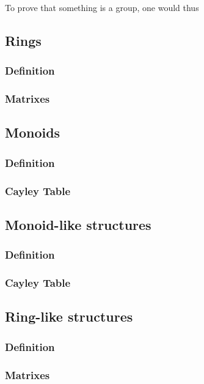 To prove that something is a group, one would thus
\subsection{Rings}
\subsubsection{Definition}
\subsubsection{Matrixes}
\subsection{Monoids}
\subsubsection{Definition}
\subsubsection{Cayley Table}
\subsection{Monoid-like structures}
\subsubsection{Definition}
\subsubsection{Cayley Table}
\subsection{Ring-like structures}
\subsubsection{Definition}
\subsubsection{Matrixes}
